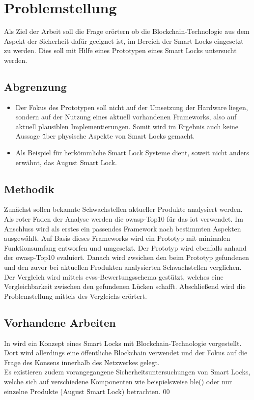 \section{Problemstellung}
\label{sec:problem}
    Als Ziel der Arbeit soll die Frage erörtern ob die Block\-chain\--Tech\-no\-lo\-gie aus dem Aspekt der Sicherheit dafür geeignet ist, im Bereich der Smart Locks eingesetzt zu werden.
    Dies soll mit Hilfe eines Prototypen eines Smart Locks untersucht werden.
    
    \subsection{Abgrenzung}
    \label{sec:problem_limit}
    	\begin{itemize}
    		\item Der Fokus des Prototypen soll nicht auf der Umsetzung der Hardware liegen, sondern auf der Nutzung eines aktuell vorhandenen Frameworks, also auf aktuell plausiblen Implementierungen.
    		Somit wird im Ergebnis auch keine Aussage über physische Aspekte von Smart Locks gemacht.
    		\item Als Beispiel für herkömmliche Smart Lock Systeme dient, soweit nicht anders erwähnt, das August Smart Lock.
    	\end{itemize}

    \subsection{Methodik}
    \label{sec:problem_methods}
        Zunächst sollen bekannte Schwachstellen aktueller Produkte analysiert werden.
        Als roter Faden der Analyse werden die \gls{owasp}-Top10 für das \gls{iot}\cite{Miessler2015a} verwendet.
        Im Anschluss wird als erstes ein passendes Framework nach bestimmten Aspekten ausgewählt.
        Auf Basis dieses Frameworks wird ein Prototyp mit minimalen Funktionsumfang entworfen und umgesetzt.
        Der Prototyp wird ebenfalls anhand der \gls{owasp}-Top10 evaluiert.
        Danach wird zwsichen den beim Prototyp gefundenen und den zuvor bei aktuellen Produkten analysierten Schwachstellen verglichen.
        Der Vergleich wird mittels \gls{cvss}-Bewertungsschema gestützt, welches eine Vergleichbarkeit zwischen den gefundenen Lücken schafft.
        Abschließend wird die Problemstellung mittels des Vergleichs erörtert.
    
    \subsection{Vorhandene Arbeiten}
    \label{sec:problem_relatedWork}
        In \cite{Han2017} wird ein Konzept eines Smart Locks mit Blockchain-Technologie vorgestellt. 
        Dort wird allerdings eine öffentliche Blockchain verwendet und der Fokus auf die Frage des Konsens innerhalb des Netzwerkes gelegt. \\
        Es existieren zudem vorangegangene Sicherheitsuntersuchungen von Smart Locks, welche sich auf verschiedene Komponenten wie beispielsweise \gls{ble}(\cite{Rose2016}) oder nur einzelne Produkte (August Smart Lock\cite{Fuller2017,Ho2016,Ye2017}) betrachten.
00